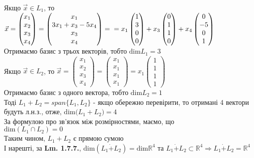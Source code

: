\documentclass[a4paper, 14pt]{extarticle}
\def\dim#1{\textrm{dim} {#1}}
\begin{document}
	Якщо $\vec{x} \in L_1$, то $\vec{x} = \begin{pmatrix} x_1 \\ x_2 \\ x_3 \\ x_4 \end{pmatrix} = \begin{pmatrix}
	x_1 \\ 3x_1+x_3-5x_4 \\ x_3 \\ x_4
	\end{pmatrix} = \\ = x_1 \begin{pmatrix}
	1 \\ 3 \\ 0 \\ 0
	\end{pmatrix} + x_3\begin{pmatrix}
	0 \\ 1 \\ 1 \\ 0
	\end{pmatrix} +  x_4\begin{pmatrix}
	0 \\ -5 \\ 0 \\ 1
	\end{pmatrix}$\\
	Отримаємо базис з трьох векторів, тобто $\dim L_1 = 3$\\
	Якщо $\vec{x} \in L_2$, то $\vec{x} = \begin{pmatrix} x_1 \\ x_2 \\ x_3 \\ x_4 \end{pmatrix} = \begin{pmatrix} x_1 \\ x_1 \\ x_1 \\ x_1 \end{pmatrix} = x_1 \begin{pmatrix} 1 \\ 1 \\ 1 \\ 1 \end{pmatrix}$\\
	Отримаємо базис з одного вектора, тобто $\dim L_2 = 1$\\
	Тоді $L_1 + L_2 = span\{L_1,L_2\}$ - якщо обережно перевірити, то отримані 4 вектори будуть л.н.з., отже, $\dim (L_1 + L_2) = 4$\\
	За формулою про зв'язок між розмірностями, маємо, що \\ $\dim{(L_1 \cap L_2)} = 0$\\
	Таким чином, $L_1 + L_2$ є прямою сумою\\
	І нарешті, за \textbf{Lm. 1.7.7.}, $\dim{(L_1 \dot{+} L_2)} = \dim {\mathbb{R}^4}$ та $L_1 \dot{+} L_2 \subset \mathbb{R}^4 \Rightarrow L_1 \dot{+} L_2 = \mathbb{R}^4$\\
	\newpage	
	
\end{document}
